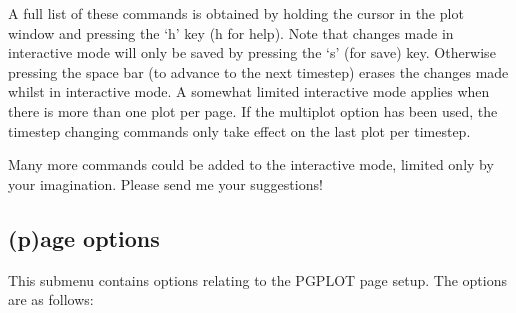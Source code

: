 \documentclass[a4paper,11pt]{article}
\begin{document}
 A full list of these commands is obtained by holding
the cursor in the plot window and pressing the `h' key (h for help). Note that changes made in interactive mode will only be saved by pressing the
`s' (for save) key. Otherwise pressing the space bar (to advance to the next
timestep) erases the changes made whilst in interactive mode. A somewhat limited
interactive mode applies when there is more than one plot per page. If the multiplot option has been used, the timestep changing commands only
take effect on the last plot per timestep.

 Many more commands could be added to
the interactive mode, limited only by your imagination. Please send me your suggestions!

\subsection{(p)age options}
\label{sec:optionspage}
 This submenu contains options relating to the PGPLOT page setup. The options are as follows:
\end{document}
